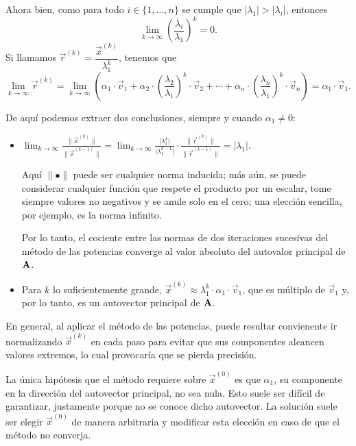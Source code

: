 Ahora bien, como para todo $i \in \{1,\dots,n\}$ se cumple que
$\lvert \lambda_1 \rvert > \lvert \lambda_i \rvert$, entonces
\[ \lim_{k\to\infty} \left(\frac{\lambda_i}{\lambda_1}\right)^k = 0. \]
Si llamamos $\vec{r}^{(k)} = \dfrac{\vec{x}^{(k)}}{\lambda_1^k}$,
tenemos que
\[ \lim_{k\to\infty} \vec{r}^{(k)} =
    \lim_{k\to\infty} \left( \alpha_1 \cdot \vec{v}_1
        + \alpha_2 \cdot
            \left(\frac{\lambda_2}{\lambda_1}\right)^k \cdot \vec{v}_2
        + \cdots + \alpha_n \cdot
            \left(\frac{\lambda_n}{\lambda_1}\right)^k \cdot \vec{v}_n
        \right) = \alpha_1 \cdot \vec{v}_1. \]

De aquí podemos extraer dos conclusiones, siempre y cuando $\alpha_1 \neq 0$:
\begin{itemize}
\item $\displaystyle \lim_{k\to\infty}
        \frac{\lVert \vec{x}^{(k)} \rVert}
             {\lVert \vec{x}^{(k-1)} \rVert}
    = \lim_{k\to\infty}
        \frac{\lvert \lambda_1^k\rvert}{\lvert \lambda_1^{k-1}\rvert} \cdot
        \frac{\lVert \vec{r}^{(k)} \rVert}{\lVert \vec{r}^{(k-1)} \rVert}
    = \lvert \lambda_1 \rvert$.

    Aquí $\lVert \bullet \lVert$ puede ser cualquier norma inducida; más aún,
    se puede considerar cualquier función que respete el producto por un
    escalar, tome siempre valores no negativos y se anule solo en el cero;
    una elección sencilla, por ejemplo, es la norma infinito.

    Por lo tanto, el cociente entre las normas de dos iteraciones sucesivas
    del método de las potencias converge al valor absoluto del autovalor
    principal de $\mathbf{A}$.
\item Para $k$ lo suficientemente grande, $\vec{x}^{(k)} \approx \lambda_1^k
    \cdot \alpha_1 \cdot \vec{v}_1$, que es múltiplo de $\vec{v}_1$ y, por
    lo tanto, es un autovector principal de $\mathbf{A}$.
\end{itemize}

En general, al aplicar el método de las potencias, puede resultar convienente
ir normalizando $\vec{x}^{(k)}$ en cada paso para evitar que sus componentes
alcancen valores extremos, lo cual provocaría que se pierda precisión.

La única hipótesis que el método requiere sobre $\vec{x}^{(0)}$ es que
$\alpha_1$, su componente en la dirección del autovector principal, no sea
nula. Esto suele ser difícil de garantizar, justamente porque no se conoce
dicho autovector. La solución suele ser elegir $\vec{x}^{(0)}$ de manera
arbitraria y modificar esta elección en caso de que el método no converja.

